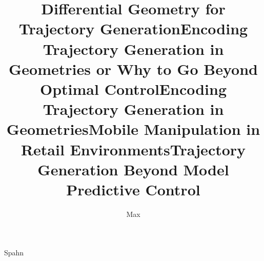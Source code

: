 \author{Max}{Spahn}

\title[Reactive Trajectory Encodings for Mobile Manipulators]{Differential Geometry for Trajectory Generation}
\title[]{Encoding Trajectory Generation in Geometries or Why to Go Beyond Optimal
Control}
\title[How can Robots Follow Paths?]{Encoding Trajectory Generation in Geometries}
\title[Reactive Trajectory Generation for High-Dimensional Robots]{Mobile Manipulation in Retail Environments}
\title[Differential Geometry for Behavior Encoding]{Trajectory Generation Beyond Model Predictive Control}

\newcommand\promotor{prof.\ dr.\ M.\ Wisse}
\newcommand\copromotor{dr.\ J.\ Alonso-Mora}

